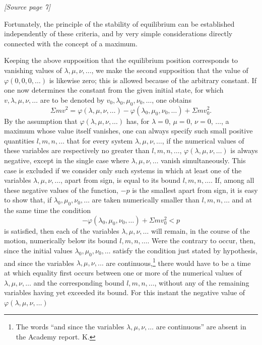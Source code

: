 \documentclass[11pt]{article}
\newcommand{\sourcepage}[1]{\par\smallskip\noindent\textit{[Source page #1]}\par\smallskip}
\begin{document}
\sourcepage{7}

Fortunately, the principle of the stability of equilibrium can be established independently of these criteria, and by very simple considerations directly connected with the concept of a maximum.

Keeping the above supposition that the equilibrium position corresponds to vanishing values of $\lambda,\mu,\nu,\ldots$, we make the second supposition that the value of $\varphi(0,0,0,\ldots)$ is likewise zero; this is allowed because of the arbitrary constant. If one now determines the constant from the given initial state, for which $v,\lambda,\mu,\nu,\ldots$ are to be denoted by $v_0,\lambda_0,\mu_0,\nu_0,\ldots$, one obtains
\[
\Sigma m v^2 = \varphi(\lambda,\mu,\nu,\ldots)-\varphi(\lambda_0,\mu_0,\nu_0,\ldots)+\Sigma m v_0^2.
\]
By the assumption that $\varphi(\lambda,\mu,\nu,\ldots)$ has, for $\lambda=0$, $\mu=0$, $\nu=0$, $\ldots$, a maximum whose value itself vanishes, one can always specify such small positive quantities $l,m,n,\ldots$ that for every system $\lambda,\mu,\nu,\ldots$, if the numerical values of these variables are respectively no greater than $l,m,n,\ldots$, $\varphi(\lambda,\mu,\nu,\ldots)$ is always negative, except in the single case where $\lambda,\mu,\nu,\ldots$ vanish simultaneously. This case is excluded if we consider only such systems in which at least one of the variables $\lambda,\mu,\nu,\ldots$, apart from sign, is equal to its bound $l,m,n,\ldots$. If, among all these negative values of the function, $-p$ is the smallest apart from sign, it is easy to show that, if $\lambda_0,\mu_0,\nu_0,\ldots$ are taken numerically smaller than $l,m,n,\ldots$ and at the same time the condition
\[
-\varphi(\lambda_0,\mu_0,\nu_0,\ldots)+\Sigma m v_0^2<p
\]
is satisfied, then each of the variables $\lambda,\mu,\nu,\ldots$ will remain, in the course of the motion, numerically below its bound $l,m,n,\ldots$. Were the contrary to occur, then, since the initial values $\lambda_0,\mu_0,\nu_0,\ldots$ satisfy the condition just stated by hypothesis, and since the variables $\lambda,\mu,\nu,\ldots$ are continuous,\footnote{The words ``and since the variables $\lambda,\mu,\nu,\ldots$ are continuous'' are absent in the Academy report. K.} there would have to be a time at which equality first occurs between one or more of the numerical values of $\lambda,\mu,\nu,\ldots$ and the corresponding bound $l,m,n,\ldots$, without any of the remaining variables having yet exceeded its bound. For this instant the negative value of $\varphi(\lambda,\mu,\nu,\ldots)$
\end{document}
